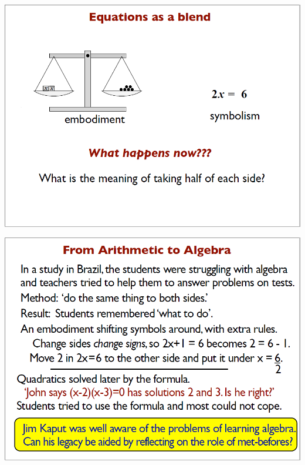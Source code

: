 \documentclass{article}
\begin{document}
\begin{minipage}[t]{0.32\linewidth} 	
	\includegraphics[width=1\textwidth]{david_tall/dt20.png}
	
	\includegraphics[width=1\textwidth]{david_tall/dt23.png}
\end{minipage}
\hspace{\fill}
\end{document}
